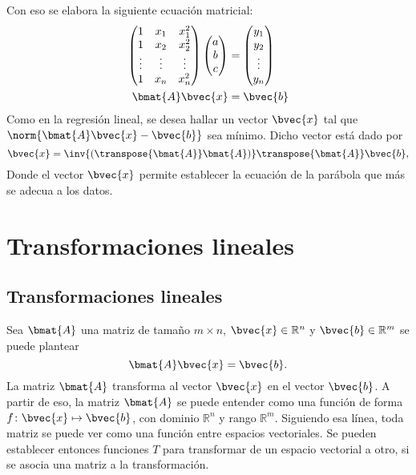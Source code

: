 \documentclass{fmbnotes}
\begin{document}
Con eso se elabora la siguiente ecuación matricial:
\begin{align*}
\begin{pmatrix}
	1 & x_1 & x_1^2\\ 1 & x_2&x_2^2\\ \vdots & \vdots&\vdots \\1 & x_n&x_n^2
\end{pmatrix}\begin{pmatrix}
a\\b\\c
\end{pmatrix}&=\begin{pmatrix}
y_1 \\y_2\\ \vdots \\y_n
\end{pmatrix}\\
\bmat{A}\bvec{x}&=\bvec{b}
\end{align*}
Como en la regresión lineal, se desea hallar un vector \(\bvec{x}\) tal que \(\norm{\bmat{A}\bvec{x}-\bvec{b}}\) sea mínimo. Dicho vector está dado por
\begin{equation*}
 \bvec{x}=\inv{(\transpose{\bmat{A}}\bmat{A})}\transpose{\bmat{A}} \bvec{b},
\end{equation*}
Donde el vector \(\bvec{x}\) permite establecer la ecuación de la parábola que más se adecua a los datos.

\section{Transformaciones lineales}

\subsection{Transformaciones lineales}

Sea \(\bmat{A}\) una matriz de tamaño \(m \times n\), \(\bvec{x}\in\mathbb{R}^{n}\) y \(\bvec{b}\in\mathbb{R}^{m}\) se puede plantear 
\[\bmat{A}\bvec{x}=\bvec{b}.\]
La matriz \(\bmat{A}\) transforma al vector \(\bvec{x}\) en el vector \(\bvec{b}\). A partir de eso, la matriz \(\bmat{A}\) se puede entender como una función de forma \(f\colon\bvec{x}\mapsto\bvec{b}\), con dominio \(\mathbb{R}^{n}\) y rango \(\mathbb{R}^{m}\). Siguiendo esa línea, toda matriz se puede ver como una función entre espacios vectoriales. Se pueden establecer entonces funciones \(T\) para transformar de un espacio vectorial a otro, si se asocia una matriz a la transformación.
\end{document}
